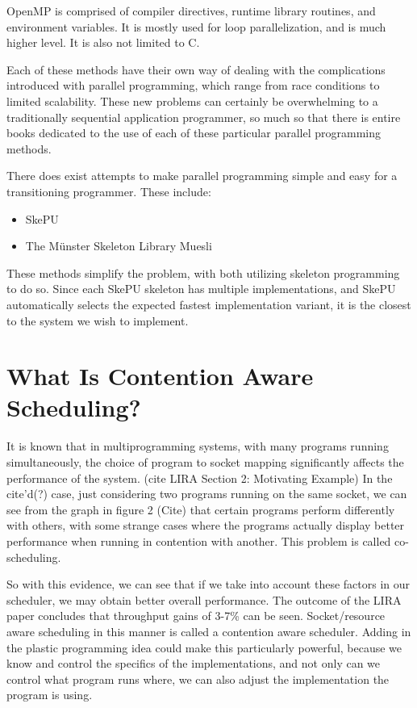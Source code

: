 OpenMP is comprised of compiler directives, runtime library routines, and environment variables. It is mostly used for loop parallelization, and is much higher level. It is also not limited to C.

Each of these methods have their own way of dealing with the complications introduced with parallel programming, which range from race conditions to limited scalability. These new problems can certainly be overwhelming to a traditionally sequential application programmer, so much so that there is entire books dedicated to the use of each of these particular parallel programming methods. 

There does exist attempts to make parallel programming simple and easy for a transitioning programmer. These include:

\begin{itemize}
	\item SkePU
	\item The Münster Skeleton Library Muesli
\end{itemize}

These methods simplify the problem, with both utilizing skeleton programming to do so. Since each SkePU skeleton has multiple implementations, and SkePU automatically selects the expected fastest implementation variant, it is the closest to the system we wish to implement.



\section{What Is Contention Aware Scheduling?}

It is known that in multiprogramming systems, with many programs running simultaneously, the choice of program to socket mapping significantly affects the performance of the system. (cite LIRA Section 2: Motivating Example) In the cite'd(?) case, just considering two programs running on the same socket, we can see from the graph in figure 2 (Cite) that certain programs perform differently with others, with some strange cases where the programs actually display better performance when running in contention with another. This problem is called co-scheduling.

So with this evidence, we can see that if we take into account these factors in our scheduler, we may obtain better overall performance. The outcome of the LIRA paper concludes that throughput gains of 3-7\% can be seen. Socket/resource aware scheduling in this manner is called a contention aware scheduler. Adding in the plastic programming idea could make this particularly powerful, because we know and control the specifics of the implementations, and not only can we control what program runs where, we can also adjust the implementation the program is using.



